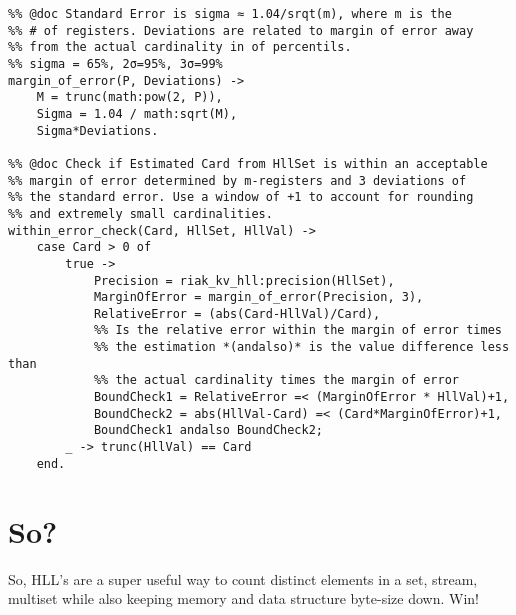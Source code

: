 \documentclass[12pt]{article}
\begin{document}
\begin{lstlisting}
%% @doc Standard Error is sigma ≈ 1.04/srqt(m), where m is the
%% # of registers. Deviations are related to margin of error away
%% from the actual cardinality in of percentils.
%% sigma = 65%, 2σ=95%, 3σ=99%
margin_of_error(P, Deviations) ->
    M = trunc(math:pow(2, P)),
    Sigma = 1.04 / math:sqrt(M),
    Sigma*Deviations.

%% @doc Check if Estimated Card from HllSet is within an acceptable
%% margin of error determined by m-registers and 3 deviations of
%% the standard error. Use a window of +1 to account for rounding
%% and extremely small cardinalities.
within_error_check(Card, HllSet, HllVal) ->
    case Card > 0 of
        true ->
            Precision = riak_kv_hll:precision(HllSet),
            MarginOfError = margin_of_error(Precision, 3),
            RelativeError = (abs(Card-HllVal)/Card),
            %% Is the relative error within the margin of error times
            %% the estimation *(andalso)* is the value difference less than
            %% the actual cardinality times the margin of error
            BoundCheck1 = RelativeError =< (MarginOfError * HllVal)+1,
            BoundCheck2 = abs(HllVal-Card) =< (Card*MarginOfError)+1,
            BoundCheck1 andalso BoundCheck2;
        _ -> trunc(HllVal) == Card
    end.
\end{lstlisting}

\section{So?}

So, HLL's are a super useful way to count distinct elements in a set, stream,
multiset while also keeping memory and data structure byte-size down. Win!

\printbibliography
\end{document}
